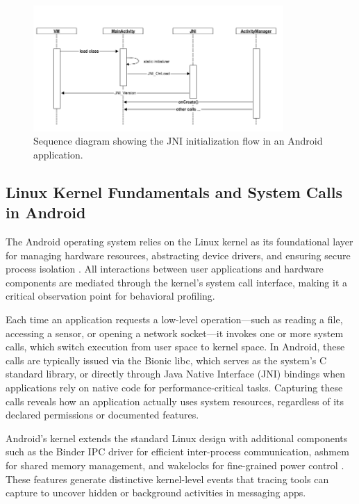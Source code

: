 \documentclass[a4paper,12pt]{report}
\begin{document}
\begin{figure}[H]
    \centering
    \includegraphics[width=0.85\textwidth]{jni_init_flow.png}
    \caption{Sequence diagram showing the JNI initialization flow in an Android application.}
    \label{fig:jni_init}
\end{figure}

\subsection{Linux Kernel Fundamentals and System Calls in Android}
The Android operating system relies on the Linux kernel as its foundational layer for managing hardware resources, abstracting device drivers, and ensuring secure process isolation \cite{love2010linux}. All interactions between user applications and hardware components are mediated through the kernel’s system call interface, making it a critical observation point for behavioral profiling.

Each time an application requests a low-level operation—such as reading a file, accessing a sensor, or opening a network socket—it invokes one or more system calls, which switch execution from user space to kernel space. In Android, these calls are typically issued via the Bionic libc, which serves as the system’s C standard library, or directly through Java Native Interface (JNI) bindings when applications rely on native code for performance-critical tasks. Capturing these calls reveals how an application actually uses system resources, regardless of its declared permissions or documented features.

Android’s kernel extends the standard Linux design with additional components such as the Binder IPC driver for efficient inter-process communication, ashmem for shared memory management, and wakelocks for fine-grained power control \cite{AOSPArchOverview}. These features generate distinctive kernel-level events that tracing tools can capture to uncover hidden or background activities in messaging apps.
\end{document}
